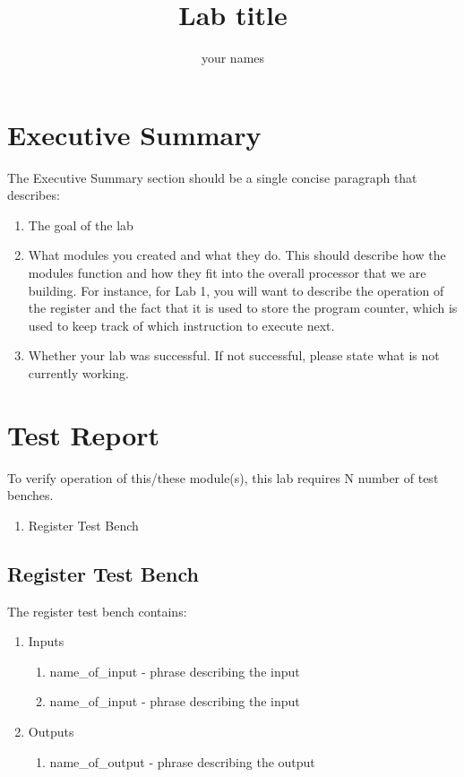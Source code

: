 \documentclass{article}
\author{your names}
\title{Lab title}
\begin{document}
\maketitle

\section{Executive Summary}
The Executive Summary section should be a single concise paragraph that describes:
\begin{enumerate}
	\item The goal of the lab
	\item What modules you created and what they do.  This should describe how the modules function and how they fit into the overall processor that we are building.  For instance, for Lab 1, you will want to describe the operation of the register and the fact that it is used to store the program counter, which is used to keep track of which instruction to execute next.
	\item Whether your lab was successful.  If not successful, please state what is not currently working.
\end{enumerate}	

\section{Test Report}
To verify operation of this/these module(s), this lab requires N number of test benches.
\begin{enumerate}
	\item Register Test Bench
\end{enumerate}

\subsection{Register Test Bench}
The register test bench contains:
\begin{enumerate}
	\item Inputs
	\begin{enumerate}
		\item name\_of\_input - phrase describing the input
		\item name\_of\_input - phrase describing the input
	\end{enumerate}	
	\item Outputs
	\begin{enumerate}	
		\item name\_of\_output - phrase describing the output
	\end{enumerate}
\end{enumerate} 
\end{document}
